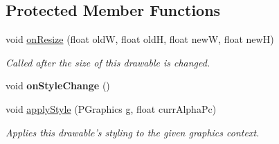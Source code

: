 \subsection*{Protected Member Functions}
\begin{DoxyCompactItemize}
\item 
void \hyperlink{classhype_1_1core_1_1drawable_1_1_h_drawable_ad83f255e2de9bb08f52c160c5bdcc1d7}{on\-Resize} (float old\-W, float old\-H, float new\-W, float new\-H)
\begin{DoxyCompactList}\small\item\em Called after the size of this drawable is changed. \end{DoxyCompactList}\item 
\hypertarget{classhype_1_1core_1_1drawable_1_1_h_drawable_af042f76a7f5b5fb39aa208478b95a9da}{void {\bfseries on\-Style\-Change} ()}\label{classhype_1_1core_1_1drawable_1_1_h_drawable_af042f76a7f5b5fb39aa208478b95a9da}

\item 
void \hyperlink{classhype_1_1core_1_1drawable_1_1_h_drawable_a074f64be91a3fab5d007905ff140f15a}{apply\-Style} (P\-Graphics g, float curr\-Alpha\-Pc)
\begin{DoxyCompactList}\small\item\em Applies this drawable's styling to the given graphics context. \end{DoxyCompactList}\end{DoxyCompactItemize}
